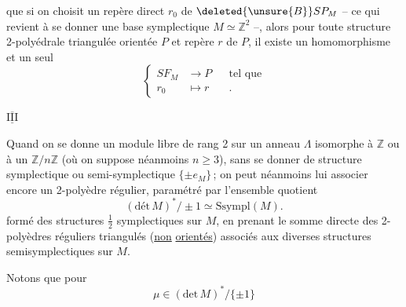 que si on choisit un repère direct $r_0$  de $\deleted{\unsure{B}}SP_M$ -- ce qui revient à se donner une base symplectique $M\simeq\mathbb Z^2$ --, alors pour toute structure 2-polyédrale triangulée orientée $P$ et  repère $r$ de $P$, il existe un homomorphisme et un seul
\[
\left\{\begin{aligned}
SF_M&\longrightarrow P&&\text{tel que}\\
r_0&\longmapsto r&&.
\end{aligned}\right.
\]

\(\overline{\underline{\mathrm{III}}}\)

Quand on se donne un module libre  de rang 2 sur un anneau $\Lambda$  isomorphe à  $\mathbb Z$ ou à un $\mathbb Z/n\mathbb Z$ (où on suppose néanmoins $n\geqslant3$), sans se donner de structure symplectique  ou semi-symplectique $\{\pm e_M\}$\,; on peut néanmoins lui associer encore un 2-polyèdre  régulier,   paramétré par l'ensemble quotient
\[
(\mathrm{dét}\,M)^*/\pm1\simeq\mathrm{Ssympl}(M).\tag*{(89)}
\]
formé des structures $\tfrac12$ symplectiques sur $M$,
en prenant le  somme directe des 2-polyèdres réguliers triangulés (\uline{non} \uline{orientés}) associés aux diverses structures semisymplectiques sur $M$.

Notons que pour
\[
\mu\in(\mathrm{det}\,M)^*/\{\pm1\}\tag*{(90)}
\]
